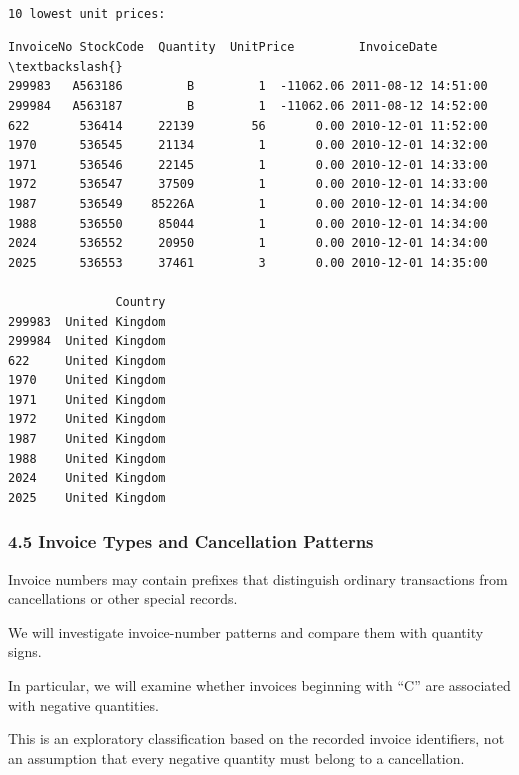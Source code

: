 \documentclass[11pt]{article}
\begin{document}
    
    \begin{Verbatim}[commandchars=\\\{\}]

10 lowest unit prices:
    \end{Verbatim}

    
    \begin{Verbatim}[commandchars=\\\{\}]
       InvoiceNo StockCode  Quantity  UnitPrice         InvoiceDate  \textbackslash{}
299983   A563186         B         1  -11062.06 2011-08-12 14:51:00   
299984   A563187         B         1  -11062.06 2011-08-12 14:52:00   
622       536414     22139        56       0.00 2010-12-01 11:52:00   
1970      536545     21134         1       0.00 2010-12-01 14:32:00   
1971      536546     22145         1       0.00 2010-12-01 14:33:00   
1972      536547     37509         1       0.00 2010-12-01 14:33:00   
1987      536549    85226A         1       0.00 2010-12-01 14:34:00   
1988      536550     85044         1       0.00 2010-12-01 14:34:00   
2024      536552     20950         1       0.00 2010-12-01 14:34:00   
2025      536553     37461         3       0.00 2010-12-01 14:35:00   

               Country  
299983  United Kingdom  
299984  United Kingdom  
622     United Kingdom  
1970    United Kingdom  
1971    United Kingdom  
1972    United Kingdom  
1987    United Kingdom  
1988    United Kingdom  
2024    United Kingdom  
2025    United Kingdom  
    \end{Verbatim}

    
    \subsubsection{4.5 Invoice Types and Cancellation
Patterns}\label{invoice-types-and-cancellation-patterns}

Invoice numbers may contain prefixes that distinguish ordinary
transactions from cancellations or other special records.

We will investigate invoice-number patterns and compare them with
quantity signs.

In particular, we will examine whether invoices beginning with ``C'' are
associated with negative quantities.

This is an exploratory classification based on the recorded invoice
identifiers, not an assumption that every negative quantity must belong
to a cancellation.
\end{document}
